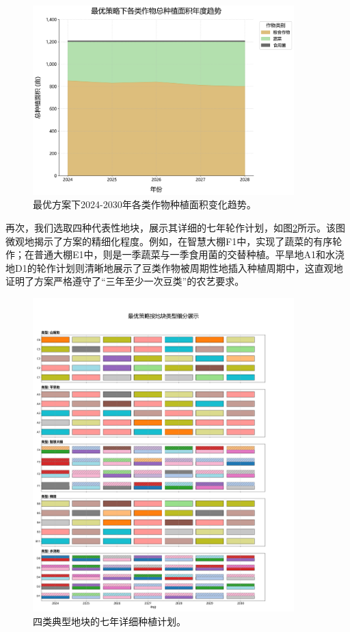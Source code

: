 \begin{figure}[H]
    \centering
    \includegraphics[width=0.9\textwidth]{figs/5问题三/年度种植面积堆叠图_最终参考版.png}
    \caption{最优方案下2024-2030年各类作物种植面积变化趋势。}
    \label{fig:area_stack}
\end{figure}

再次，我们选取四种代表性地块，展示其详细的七年轮作计划，如图\ref{fig:plot_plan}所示。该图微观地揭示了方案的精细化程度。例如，在智慧大棚F1中，实现了蔬菜的有序轮作；在普通大棚E1中，则是一季蔬菜与一季食用菌的交替种植。平旱地A1和水浇地D1的轮作计划则清晰地展示了豆类作物被周期性地插入种植周期中，这直观地证明了方案严格遵守了“三年至少一次豆类”的农艺要求。

\begin{figure}[H]
    \centering
    \includegraphics[width=0.9\textwidth]{figs/5问题三/典型地块种植计划图.png}
    \caption{四类典型地块的七年详细种植计划。}
    \label{fig:plot_plan}
\end{figure}

